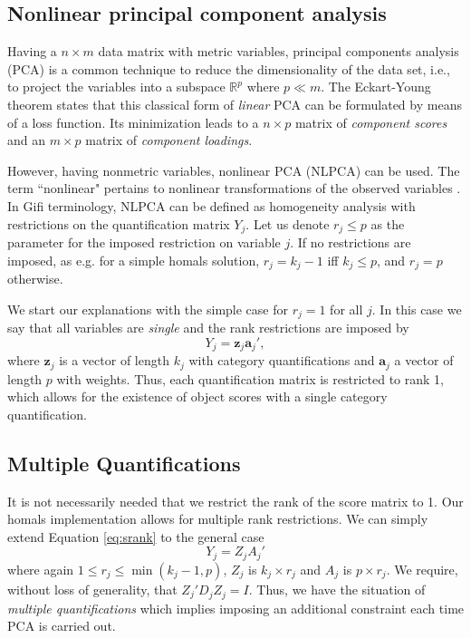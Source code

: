 \documentclass[article]{jss1}
\begin{document}
\subsection{Nonlinear principal component analysis}
Having a $n \times m$ data matrix with metric variables, principal components analysis (PCA) is a common technique to reduce the dimensionality of the data set, i.e., to project the variables into a subspace $\mathbb{R}^p$ where $p \ll m$. The Eckart-Young theorem states that this classical form of \emph{linear} PCA can be formulated by means of a loss function. Its minimization leads to a $n\times p$ matrix of \emph{component scores} and an $m \times p$ matrix of \emph{component loadings}.

However, having nonmetric variables, nonlinear PCA (NLPCA) can be used. The term ``nonlinear" pertains to nonlinear transformations of the observed variables \citep{deLeeuw:06}. In Gifi terminology, NLPCA can be defined as homogeneity analysis with restrictions on the quantification matrix $Y_j$. Let us denote $r_j \leq p$ as the parameter for the imposed restriction on variable $j$. If no restrictions are imposed, as e.g. for a simple homals solution, 
$r_j = k_j -1$ iff $k_j \leq p$, and $r_j = p$ otherwise. 

We start our explanations with the simple case for $r_j = 1$ for all $j$. In this case we say that all variables are \emph{single} and the rank restrictions are imposed by 
\begin{equation}
\label{eq:srank}
Y_j = \mathbf{z}_j\mathbf{a}_j',
\end{equation}
where $\mathbf{z}_j$ is a vector of length $k_j$ with category quantifications and $\mathbf{a}_j$ a vector of length $p$ with weights. Thus, each quantification matrix is restricted to rank 1, which allows for the existence of object scores with a single category quantification. 

\subsection{Multiple Quantifications}
It is not necessarily needed that we restrict the rank of the score matrix to 1. Our homals implementation allows for multiple rank restrictions. We can simply extend Equation \ref{eq:srank} to the general case 
\begin{equation}
\label{E:res}
Y_j=Z_jA_j'
\end{equation}
where again $1 \leq r_j \leq \min{(k_j-1,p)}$, $Z_j$ is $k_j \times r_j$ and $A_j$ is $p \times r_j$. We require, without loss of generality, that
$Z_j'D_j^{}Z_j^{}=I$. Thus, we have the situation of \emph{multiple quantifications} which implies imposing an additional constraint each time PCA is carried out. 
\end{document}
